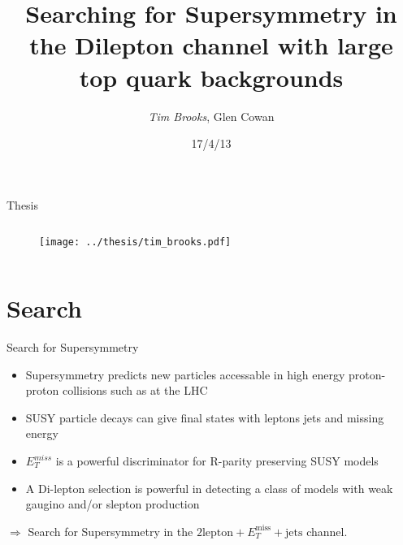 \documentclass{beamer}
\title[Searching for Dilepton SUSY with $t\bar{t}$ backgrounds\hspace{2.5em}\insertframenumber/18]{Searching for Supersymmetry in the Dilepton channel with large top quark backgrounds} %
\author{\emph{Tim Brooks}, Glen Cowan}
\institute{Royal Holloway University of London}
\date{17/4/13}
\begin{document}
\begin{frame}
\titlepage
\end{frame}

\begin{frame}{Thesis}
  \begin{columns}
    \begin{column}{0.5\textwidth}\begin{figure}
      \texttt{[image: ../thesis/tim\_brooks.pdf]}
    \end{figure}\end{column}
  \end{columns}
\end{frame}

\section{Search}
\begin{frame}{Search for Supersymmetry}
  \begin{itemize}
    \item Supersymmetry predicts new particles accessable in high energy proton-proton collisions such as at the LHC
    \item SUSY particle decays can give final states with leptons jets and missing energy
    \item $E_{T}^{miss}$ is a powerful discriminator for R-parity preserving SUSY models
    \item A Di-lepton selection is powerful in detecting a class of models with weak gaugino and/or slepton production
  \end{itemize}
$\Rightarrow$ Search for Supersymmetry in the $2 \text{lepton} + E_{T}^{\text{miss}} + \text{jets}$ channel.
\end{frame}


\end{document}
